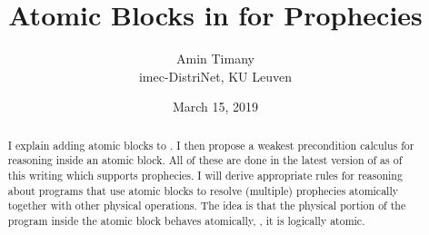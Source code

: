 \documentclass{article}
\title{\bfseries Atomic Blocks in \Iris{} for Prophecies}
\author{Amin Timany\\ {imec-DistriNet, KU Leuven}}
\date{March 15, 2019}
\begin{document}
\maketitle

\begin{abstract}
  I explain adding atomic blocks to \Iris{}. I then propose a weakest
  precondition calculus for reasoning inside an atomic block. All of
  these are done in the latest version of \Iris{} as of this writing
  which supports prophecies. I will derive appropriate rules for
  reasoning about programs that use atomic blocks to resolve
  (multiple) prophecies atomically together with other physical
  operations. The idea is that the physical portion of the program
  inside the atomic block behaves atomically, \ie, it is logically
  atomic.
\end{abstract}
\end{document}
